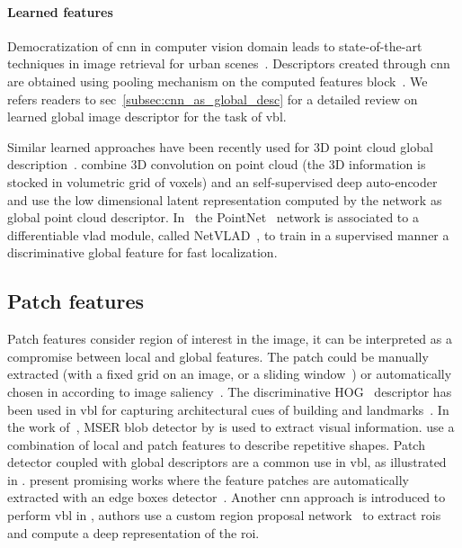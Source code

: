 		\paragraph{Learned features}
			\label{para:global_cnn}
			Democratization of \ac{cnn} in computer vision domain leads to state-of-the-art techniques in image retrieval for urban scenes~\citep{Arandjelovic2017,Gordo2016,Kim2017a,Radenovic2016}. Descriptors created through \ac{cnn} are obtained using pooling mechanism on the computed features block~\citep{Babenko2014}. We refers readers to \acl{sec}~\ref{subsec:cnn_as_global_desc} for a detailed review on learned global image descriptor for the task of \ac{vbl}. 
			
			Similar learned approaches have been recently used for 3D point cloud global description~\citep{Uy2018,Schonberger2017a}. \citet{Schonberger2017a} combine 3D convolution on point cloud (the 3D information is stocked in volumetric grid of voxels) and an self-supervised deep auto-encoder and use the low dimensional latent representation computed by the network as global point cloud descriptor. In~\citep{Uy2018} the PointNet~\citep{Qi2016a} network is associated to a differentiable \ac{vlad} module, called NetVLAD~\citep{Arandjelovic2017}, to train in a supervised manner a discriminative global feature for fast localization.

	\subsection{Patch features}
		\label{subsec:hybrid_feature}
		Patch features consider region of interest in the image, it can be interpreted as a compromise between local and global features. The patch could be manually extracted (with a fixed grid on an image, or a sliding window~\citep{Dalal2005}) or automatically chosen in according to image saliency~\citep{Matas2004}. The discriminative HOG~\citep{Dalal2005} descriptor has been used in \ac{vbl} for capturing architectural cues of building and landmarks~\citep{Shrivastava2011, Aubry2014, McManus2014,Morago2016}. In the work of~\citep{Nister2006,Kim2015}, MSER blob detector by \citet{Matas2004} is used to extract visual information. \citet{Morago2016} use a combination of local and patch features to describe repetitive shapes. Patch detector coupled with global descriptors are a common use in \ac{vbl}, as illustrated in \citep{Kim2015,Gordo2016,Sunderhauf2015a,Yan2016}. \citet{Sunderhauf2015a} present promising works where the feature patches are automatically extracted with an edge boxes detector~\citep{Zitnick2014}. Another \ac{cnn} approach is introduced to perform \ac{vbl} in \citep{Gordo2016}, authors use a custom region proposal network~\citep{Ren2015} to extract \acp{roi} and compute a deep representation of the \ac{roi}.
			
		